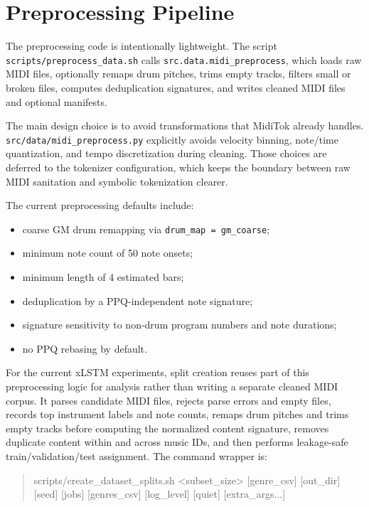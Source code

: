 \section{Preprocessing Pipeline} The preprocessing code is intentionally lightweight. The script \verb|scripts/preprocess_data.sh| calls \verb|src.data.midi_preprocess|, which loads raw MIDI files, optionally remaps drum pitches, trims empty tracks, filters small or broken files, computes deduplication signatures, and writes cleaned MIDI files and optional manifests.



The main design choice is to avoid transformations that MidiTok already handles. \verb|src/data/midi_preprocess.py| explicitly avoids velocity binning, note/time quantization, and tempo discretization during cleaning. Those choices are deferred to the tokenizer configuration, which keeps the boundary between raw MIDI sanitation and symbolic tokenization clearer.

The current preprocessing defaults include:
\begin{itemize}
	\item coarse GM drum remapping via \verb|drum_map = gm_coarse|;
	\item minimum note count of 50 note onsets;
	\item minimum length of 4 estimated bars;
	\item deduplication by a PPQ-independent note signature;
	\item signature sensitivity to non-drum program numbers and note durations;
	\item no PPQ rebasing by default.
\end{itemize}

For the current xLSTM experiments, split creation reuses part of this preprocessing logic for analysis rather than writing a separate cleaned MIDI corpus. It parses candidate MIDI files, rejects parse errors and empty files, records top instrument labels and note counts, remaps drum pitches and trims empty tracks before computing the normalized content signature, removes duplicate content within and across music IDs, and then performs leakage-safe train/validation/test assignment. The command wrapper is:
\begin{quote}
	\small\ttfamily
	scripts/create\_dataset\_splits.sh \textless subset\_size\textgreater{} [genre\_csv] [out\_dir]\\
	\hspace*{2em}[seed] [jobs] [genres\_csv] [log\_level] [quiet] [extra\_args...]
\end{quote}
